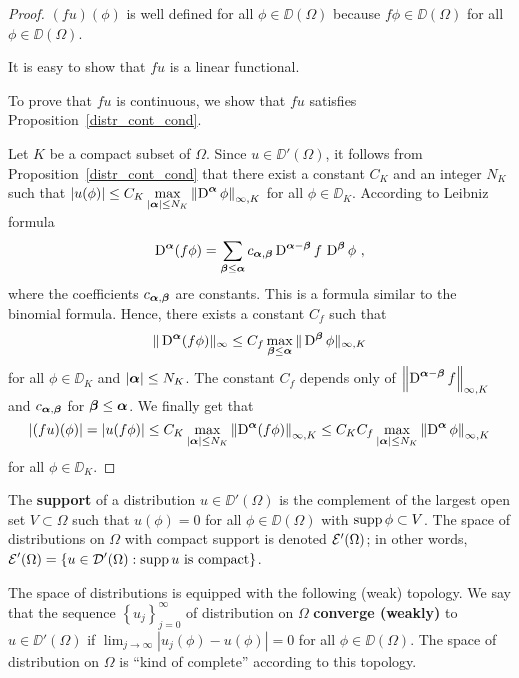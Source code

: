 \begin{proof}
 $(f u)(\phi)$ is well defined for all $\phi \in \DD(\Omega)$
because $f \phi \in \DD(\Omega)$ for all $\phi\in \DD(\Omega)$.

 It is easy to show that $f u$ is a linear functional.

 To prove that $f u$ is continuous, we show that $f u$
satisfies Proposition~\ref{distr_cont_cond}.

Let $K$ be a compact subset of $\Omega$.  Since $u\in \DD'(\Omega)$,
it follows from Proposition~\ref{distr_cont_cond} that there exist a
constant $C_K$ and an integer $N_K$ such that
$\displaystyle \left| u(\phi) \right| \leq C_K \max_{|{\bm{\alpha}}|\leq N_K}
\left\| \operatorname{D}^{{\bm{\alpha}}} \phi \right\|_{\infty,K}$ for all
$\phi \in \DD_K$.  According to Leibniz formula
\[
\diff^{\VEC{\alpha}} (f \phi) = \sum_{\VEC{\beta} \leq \VEC{\alpha}}
c_{\VEC{\alpha},\VEC{\beta}}
\diff^{\VEC{\alpha}-\VEC{\beta}}f \,\diff^{\VEC{\beta}} \phi \ ,
\]
where the coefficients $c_{{\bm{\alpha}},{\bm{\beta}}}$ are constants.
This is a formula similar to the binomial formula.  Hence, there
exists a constant $C_f$ such that
\[
\| \operatorname{D}^{{\bm{\alpha}}} (f \phi) \|_{\infty} \leq C_f
\max_{{\bm{\beta}}\leq{\bm{\alpha}}} \|\operatorname{D}^{{\bm{\beta}}} \phi\|_{\infty,K}
\]
for all $\phi \in \DD_K$ and $|{\bm{\alpha}}|\leq N_K$.  The constant $C_f$
depends only of
$\displaystyle \left\|\operatorname{D}^{{\bm{\alpha}}-{\bm{\beta}}} f\right\|_{\infty,K}$
and $c_{{\bm{\alpha}},{\bm{\beta}}}$ for ${\bm{\beta}} \leq {\bm{\alpha}}$.
We finally get that
\[
\left| (f u)(\phi) \right| =
\left| u(f \phi) \right| \leq C_K \max_{|{\bm{\alpha}}|\leq N_K}
\left\| \operatorname{D}^{{\bm{\alpha}}} (f \phi) \right\|_{\infty,K}
\leq C_K C_f \max_{|{\bm{\alpha}}|\leq N_K}
\left\| \operatorname{D}^{{\bm{\alpha}}} \phi \right\|_{\infty,K}
\]
for all $\phi \in \DD_K$.
\end{proof}

The {\bfseries support} of a distribution
$u\in \DD'(\Omega)$ is the complement of the largest open set
$V\subset \Omega$ such that $u(\phi)=0$ for all $\phi \in \DD(\Omega)$ with
$\operatorname{supp} \phi \subset V$.  The space of distributions on $\Omega$
with compact support is denoted $\mathcal{E}'(\Omega)$; in other words,
$\displaystyle \mathcal{E}'(\Omega) = \left\{ u \in \mathcal{D}'(\Omega) : \operatorname{supp} u
\text{ is compact} \right\}$.

The space of distributions is equipped with the following (weak) topology.
We say that the sequence
$\displaystyle \left\{ u_j\right\}_{j=0}^\infty$ of distribution on
$\Omega$ {\bfseries converge (weakly)} to
$u\in \DD'(\Omega)$ if
$\displaystyle \lim_{j\rightarrow \infty} \left|u_j(\phi) - u(\phi) \right| = 0$
for all $\phi \in \DD(\Omega)$.  The space of distribution on $\Omega$
is ``kind of complete'' according to this topology.

